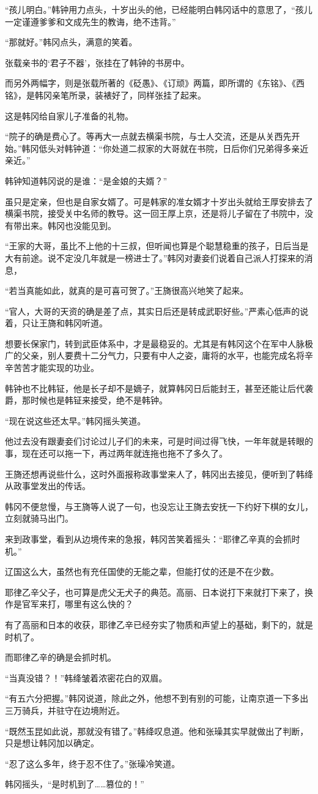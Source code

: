 “孩儿明白。”韩钟用力点头，十岁出头的他，已经能明白韩冈话中的意思了，“孩儿一定谨遵爹爹和文成先生的教诲，绝不违背。”

“那就好。”韩冈点头，满意的笑着。

张载亲书的‘君子不器’，张挂在了韩钟的书房中。

而另外两幅字，则是张载所著的《砭愚》、《订顽》两篇，即所谓的《东铭》、《西铭》，是韩冈亲笔所录，装裱好了，同样张挂了起来。

这是韩冈给自家儿子准备的礼物。

“院子的确是费心了。等再大一点就去横渠书院，与士人交流，还是从关西先开始。”韩冈低头对韩钟道：“你处道二叔家的大哥就在书院，日后你们兄弟得多亲近亲近。”

韩钟知道韩冈说的是谁：“是金娘的夫婿？”

虽只是定亲，但也是自家女婿了。可是韩家的准女婿才十岁出头就给王厚安排去了横渠书院，接受关中名师的教导。这一回王厚上京，还是将儿子留在了书院中，没有带出来。韩冈也没能见到。

“王家的大哥，虽比不上他的十三叔，但听闻也算是个聪慧稳重的孩子，日后当是大有前途。说不定没几年就是一榜进士了。”韩冈对妻妾们说着自己派人打探来的消息，

“若当真能如此，就真的是可喜可贺了。”王旖很高兴地笑了起来。

“官人，大哥的天资的确是差了点，其实日后还是转成武职好些。”严素心低声的说着，只让王旖和韩冈听道。

想要长保家门，转到武臣体系中，才是最稳妥的。尤其是有韩冈这个在军中人脉极广的父亲，别人要费十二分气力，只要有中人之姿，庸将的水平，也能完成名将辛辛苦苦才能实现的功业。

韩钟也不比韩钲，他是长子却不是嫡子，就算韩冈日后能封王，甚至还能让后代袭爵，那时候也是韩钲来接受，绝不是韩钟。

“现在说这些还太早。”韩冈摇头笑道。

他过去没有跟妻妾们讨论过儿子们的未来，可是时间过得飞快，一年年就是转眼的事，现在还可以拖一下，再过两年就连拖也拖不了多久了。

王旖还想再说些什么，这时外面报称政事堂来人了，韩冈出去接见，便听到了韩绛从政事堂发出的传话。

韩冈不便怠慢，与王旖等人说了一句，也没忘让王旖去安抚一下约好下棋的女儿，立刻就骑马出门。

来到政事堂，看到从边境传来的急报，韩冈苦笑着摇头：“耶律乙辛真的会抓时机。”

辽国这么大，虽然也有充任国使的无能之辈，但能打仗的还是不在少数。

耶律乙辛父子，也可算是虎父无犬子的典范。高丽、日本说打下来就打下来了，换作是官军来打，哪里有这么快的？

有了高丽和日本的收获，耶律乙辛已经夯实了物质和声望上的基础，剩下的，就是时机了。

而耶律乙辛的确是会抓时机。

“当真没错？！”韩绛皱着浓密花白的双眉。

“有五六分把握。”韩冈说道，除此之外，他想不到有别的可能，让南京道一下多出三万骑兵，并驻守在边境附近。

“既然玉昆如此说，那就没有错了。”韩绛叹息道。他和张璪其实早就做出了判断，只是想让韩冈加以确定。

“忍了这么多年，终于忍不住了。”张璪冷笑道。

韩冈摇头，“是时机到了……篡位的！”
